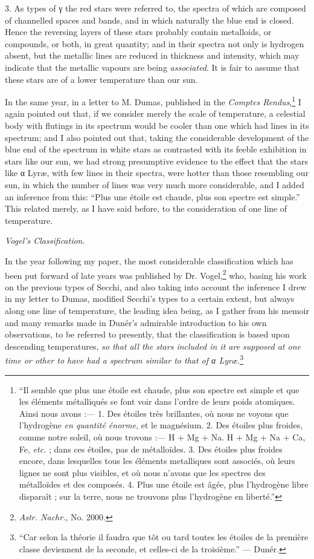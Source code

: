 \documentclass[a4paper, 12pt, oneside, polutonikogreek, english]{article}
\begin{document}
3. As types of γ the red stars were referred to, the spectra of which are composed of channelled spaces and bands, and in which naturally the blue end is closed. Hence the reversing layers of these stars probably contain metalloids, or compounds, or both, in great quantity; and in their spectra not only is hydrogen absent, but the metallic lines are reduced in thickness and intensity, which may indicate that the metallic vapours are being \emph{associated}. It is fair to assume that these stars are of a lower temperature than our sun.

In the same year, in a letter to M. Dumas, published in the \emph{Comptes Rendus},\footnote{``Il semble que plus une étoile est chaude, plus son spectre est simple et que les éléments métalliqués se font voir dans l'ordre de leurs poids atomiques. Ainsi nous avons :--- 1. Des étoiles très brillantes, où nous ne voyons que l'hydrogène \emph{en quantité énorme}, et le magnésium. 2. Des étoiles plus froides, comme notre soleil, où nous trovons :--- H + Mg + Na. H + Mg + Na + Ca, Fe, \emph{etc.} ; dans ces étoiles, pas de métalloïdes. 3. Des étoiles plus froides encore, dans lesquelles tous les éléments metalliques sont associés, où leurs lignes ne sont plus visibles, et où nous n'avons que les spectres des métalloïdes et des composés. 4. Plus une étoile est âgée, plus l'hydrogène libre disparaît ; sur la terre, nous ne trouvons plus l'hydrogène en liberté.''} I again pointed out that, if we consider merely the scale of temperature, a celestial body with flutings in its spectrum would be cooler than one which had lines in its spectrum; and I also pointed out that, taking the considerable development of the blue end of the spectrum in white stars as contrasted with its feeble exhibition in stars like our sun, we had strong presumptive evidence to the effect that the stars like α Lyræ, with few lines in their spectra, were hotter than those resembling our sun, in which the number of lines was very much more considerable, and I added an inference from this: ``Plus une étoile est chaude, plus son spectre est simple.'' This related merely, as I have said before, to the consideration of one line of temperature.

\emph{Vogel's Classification.}

In the year following my paper, the most considerable classification which has been put forward of late years was published by Dr. Vogel,\footnote{\emph{Astr. Nachr.}, No. 2000.} who, basing his work on the previous types of Secchi, and also taking into account the inference I drew in my letter to Dumas, modified Secchi's types to a certain extent, but always along one line of temperature, the leading idea being, as I gather from his memoir and many remarks made in Dunér's admirable introduction to his own observations, to be referred to presently, that the classification is based upon descending temperatures, \emph{so that all the stars included in it are supposed at one time or other to have had a spectrum similar to that of α Lyræ}.\footnote{``Car selon la théorie il faudra que tôt ou tard toutes les étoiles de la première classe deviennent de la seconde, et celles-ci de la troisième.'' --- Dunér.}
\end{document}
